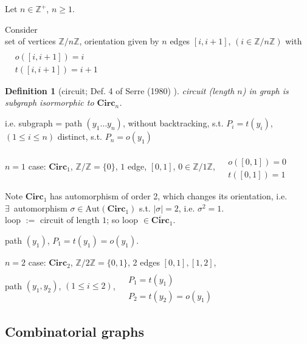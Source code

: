 \documentclass[10pt]{amsart}
\newtheorem{definition}{Definition}
\begin{document}
\begin{multicols*}{2}
Let $n\in \mathbb{Z}^+$, $n\geq 1$.  

Consider \\
set of vertices $\mathbb{Z}/n\mathbb{Z}$, orientation given by $n$ edges $[i,i+1]$, $(i\in \mathbb{Z}/n\mathbb{Z})$ with $\begin{aligned} & \quad \\
 & o([i,i+1]) = i \\
 & t([i,i+1]) = i+1 \end{aligned}$

\begin{definition}[circuit; Def. 4 of Serre (1980) \cite{Serr1980}]
	circuit (length $n$) in graph is subgraph isormorphic to $\mathbf{\text{Circ}}_n$.  
\end{definition}
i.e. subgraph = path $(y_1\dots y_n)$, without backtracking, s.t. $P_i = t(y_i)$, \, $(1\leq i \leq n)$ distinct, s.t. $P_n = o(y_1)$

$n=1$ case: $\mathbf{\text{Circ}}_1$, $\mathbb{Z}/\mathbb{Z} = \lbrace 0 \rbrace$, $1$ edge, $[0,1]$, $0 \in \mathbb{Z}/1\mathbb{Z}$, $\begin{aligned} & \quad \\
	& o([0,1]) = 0 \\
	& t([0,1]) = 1 \end{aligned}$  
	
	Note $\mathbf{\text{Circ}}_1$ has automorphism of order 2, which changes its orientation, i.e. \\
	$\exists \, $ automorphism $\sigma \in \text{Aut}( \mathbf{\text{Circ}}_1) $ s.t. $|\sigma | = 2$, i.e. $\sigma^2=1$.  \\
	loop $:= $ circuit of length $1$; so loop $\in \overline{ \mathbf{\text{Circ}} }_1$.  
	
	path $(y_1)$, $P_1 = t(y_1) = o(y_1)$.  
	
	$n=2$ case: $\mathbf{\text{Circ}}_2$, $\mathbb{Z}/2\mathbb{Z} = \lbrace 0 ,1\rbrace$, 2 edges $[0,1], [1,2]$,  \\
	path $(y_1,y_2)$, $(1\leq i \leq 2)$, $\begin{aligned} & \quad \\
		& P_1 = t(y_1) \\
		& P_2 = t(y_2) = o(y_1) \end{aligned}$  
		
		
	

\subsection{Combinatorial graphs}


\end{multicols*}
\end{document}
